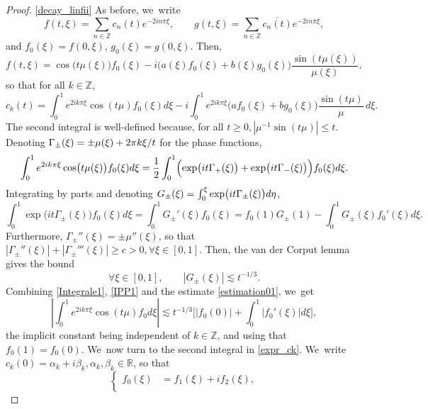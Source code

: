\documentclass[10pt]{amsart}
\theoremstyle{definition}
\let\EE\exp
\let\dis\relax
\let\ov\overline
\newcommand\R{\mathbb R}
\newcommand\Z{\mathbb Z}
\newcommand{\bbpac}[1]{\biggl[#1\biggr]}
\newcommand{\abs}[1]{\left|#1\right|}
\begin{document}
\begin{proof}
\eqref{decay_linfii} As before, we~write
\[
{f}(t,\xi) = \sum_{n\in \Z} c_n(t) e^{-2in\pi\xi}, \qquad {g}(t,\xi) = \sum_{n\in \Z} \ov{c_n(t)} e^{-2in\pi\xi},
\]
and ${f}_0(\xi) = {f}(0,\xi)$, ${g}_0(\xi) = {g}(0,\xi)$. Then,
\[
{f}(t,\xi) = \cos\bigl(t\mu(\xi)\bigr) {f}_0(\xi) -i\bigl(a(\xi){f}_0(\xi)+b(\xi){g}_0(\xi)\bigr)\frac{\sin(t\mu(\xi))}{\mu(\xi)},
\]
so that for all $k\in\Z$,
\begin{equation}\label{expr_ck}
c_k(t) = \int_0^1 e^{2ik\pi\xi}\cos(t\mu){f}_0(\xi) d\xi - i\int_0^1e^{2ik\pi\xi}\bigl(a{f}_0(\xi)+b{g}_0(\xi)\bigr)\frac{\sin(t\mu)}{\mu}\,d\xi.
\end{equation}
The second integral is well-defined because, for all $t \geq 0, \abs{ \mu^{-1}{\sin(t\mu)}} \leq t$. Denoting $\dis \Gamma_\pm(\xi) = \pm \mu(\xi) + {2\pi}k\xi/t$ for the phase functions,
\begin{equation}\label{Integrale1}
\int_0^1 e^{2ik\pi\xi}\cos\bigl(t\mu(\xi)\bigr){f}_0(\xi)d\xi = \frac12\int_0^1 \Bigl(\EE\bigl(it\Gamma_+(\xi)\bigr)+ \EE\bigl(it\Gamma_-(\xi)\bigr) \Bigr){f}_0(\xi)d\xi.
\end{equation}
Integrating by parts and denoting $\dis G_\pm(\xi) = \int_0^\xi \EE\bigl(it\Gamma_\pm(\xi)\bigr) d\eta$,
\begin{equation}\label{IPP1}
\int_0^1 \EE\bigl(it\Gamma_\pm(\xi)\bigr){f}_0(\xi)d\xi = \int_0^1G_\pm'(\xi){f}_0(\xi) = {f}_0(1)G_\pm(1) - \int_0^1G_\pm(\xi){f}_0'(\xi)d\xi.
\end{equation}
Furthermore, $\Gamma_\pm''(\xi) = \pm\mu''(\xi)$, so that $\abs{\Gamma_\pm''(\xi) } + \abs{\Gamma_\pm'''(\xi) } \geq c > 0, \forall \xi \in [0,1]$. Then, the van der Corput lemma gives the bound
\begin{equation}\label{estimation01}
\forall \xi \in [0,1], \qquad |G_\pm(\xi)| \lesssim {t^{-1/3}}.
\end{equation}
Combining \eqref{Integrale1}, \eqref{IPP1} and the estimate \eqref{estimation01}, we~get
\begin{equation}\label{Int1}
\abs{\int_0^1 e^{2ik\pi\xi}\cos(t\mu){f}_0d\xi} \lesssim {t^{-1/3}} \bbpac{|{f}_0(0)| + \int_0^1|{f}_0'(\xi)|d\xi},
\end{equation}
the implicit constant being independent of $k \in \Z$, and using that ${f}_0(1)={f}_0(0)$. We~now turn to the second integral in \eqref{expr_ck}. We~write $c_k(0) = \alpha_k + i\beta_k, \alpha_k,\beta_k \in \R$, so that
\begin{equation*}
\left\{
\begin{aligned}
{f}_0(\xi) & = {f}_1(\xi) + i{f}_2(\xi), \\[2pt]

\end{aligned}
\end{equation*}
\end{proof}
\end{document}
